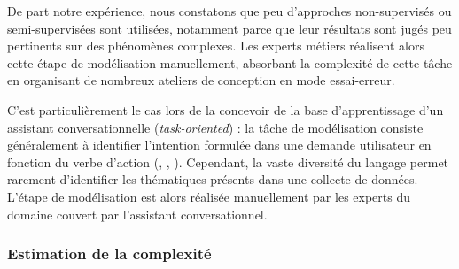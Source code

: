 			\begin{leftBarAuthorOpinion}
				De part notre expérience, nous constatons que peu d'approches non-supervisés ou semi-supervisées sont utilisées, notamment parce que leur résultats sont jugés peu pertinents sur des phénomènes complexes.
				Les experts métiers réalisent alors cette étape de modélisation manuellement, absorbant la complexité de cette tâche en organisant de nombreux ateliers de conception en mode essai-erreur.
				
				C'est particulièrement le cas lors de la concevoir de la base d'apprentissage d'un assistant conversationnelle (\textit{task-oriented}) : la tâche de modélisation consiste généralement à identifier l'intention formulée dans une demande utilisateur en fonction du verbe d'action (, , ).
				Cependant, la vaste diversité du langage permet rarement d'identifier les thématiques présents dans une collecte de données.
				L'étape de modélisation est alors réalisée manuellement par les experts du domaine couvert par l'assistant conversationnel.
			\end{leftBarAuthorOpinion}
		
		\subsubsection{Estimation de la complexité}
		\label{section:2.3.2.B-DEFIS-ANNOTATION-ASPECT-COMPLEXITE-ESTIMATION}
			
